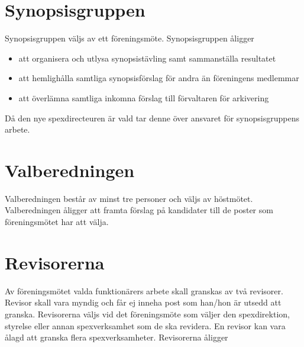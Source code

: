 \documentclass[a4paper]{article}
\begin{document}
\section{Synopsisgruppen}
\label{section:synopsisgruppen}

Synopsisgruppen väljs av ett föreningsmöte.\newline
\newline
Synopsisgruppen åligger

\begin{itemize}
  \item att organisera och utlysa synopsistävling samt sammanställa resultatet
  \item att hemlighålla samtliga synopsisförslag för andra än föreningens medlemmar 
  \item att överlämna samtliga inkomna förslag till förvaltaren för arkivering
\end{itemize}

\noindent
Då den nye spexdirecteuren är vald tar denne över ansvaret för synopsisgruppens arbete.

\section{Valberedningen}
\label{section:valberedningen}

Valberedningen består av minst tre personer och väljs av höstmötet.\newline
\newline
Valberedningen åligger att framta förslag på kandidater till de poster som föreningsmötet har att välja.

\section{Revisorerna}
\label{section:revisorerna}

Av föreningsmötet valda funktionärers arbete skall granskas av två revisorer. Revisor skall vara myndig och får ej inneha post som han/hon är utsedd att granska.\newline
\newline
Revisorerna väljs vid det föreningsmöte som väljer den spexdirektion, styrelse eller annan spexverksamhet som de ska revidera. En revisor kan vara ålagd att granska flera spexverksamheter.\newline
\newline
Revisorerna åligger
\end{document}

